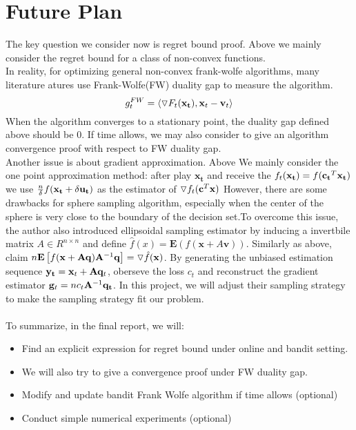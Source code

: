 \documentclass[12pt]{article}
\begin{document}
\section{Future Plan}
The key question we consider now is regret bound proof. Above we mainly consider the regret bound for a class of non-convex functions. \\
In reality, for optimizing general non-convex frank-wolfe algorithms, many literature atures use Frank-Wolfe(FW) duality gap to measure the algorithm.
\begin{equation}
    g_t^{FW} = \left \langle \triangledown F_t(\bold{x_t}), \bold{x}_t - \bold{v}_t \right \rangle
\end{equation}
When the algorithm converges to a stationary point, the duality gap defined above should be 0.
If time allows, we may also consider to give an algorithm convergence proof with respect to FW duality gap.\\
Another issue is about gradient approximation.
Above We mainly consider the one point approximation method: after play $\mathbf{x_t}$ and receive the $f_t(\bold{x_t}) = f(\bold{c_t}^T\bold{x_t})$ we use $\frac{n}{\delta}f(\bold{x_t}+\delta \bold{u_t})$ as the estimator of $\triangledown f_t(\bold{c}^T\bold{x})$
However, there are some drawbacks for sphere sampling algorithm, especially when the center of the sphere is very close to the boundary of the decision set.To overcome this issue, the author also introduced ellipsoidal sampling estimator by inducing a invertbile matrix $A \in R^{n \times n}$ and define $\hat{f}(x)=\mathbf{E} \left ( f(\mathbf{x}+ A\mathbf{v}) \right )$. Similarly as above, claim $ n \mathbf{E}\left [ f(\mathbf{x}+ \mathbf{A}\mathbf{q})\mathbf{A}^{-1}\mathbf{q} \right ] = \triangledown \hat{f}(\bold{x})$. By generating the unbiased estimation sequence $\bold{y_t}=\bold{x}_t + \bold{A}\bold{q}_t$, oberseve the loss $c_t$ and reconstruct the gradient estimator $\bold{g}_t = n c_t\bold{A}^{-1}\bold{q_t}$. In this project, we will adjust their sampling strategy to make the sampling strategy fit our problem.\\~\\
To summarize, in the final report, we will:
\begin{itemize}
    \item Find an explicit expression for regret bound under online and bandit setting.
    \item We will also try to give a convergence proof under FW duality gap.
    \item Modify and update bandit Frank Wolfe algorithm if time allows (optional)
    \item Conduct simple numerical experiments (optional)
\end{itemize}




\end{document}
